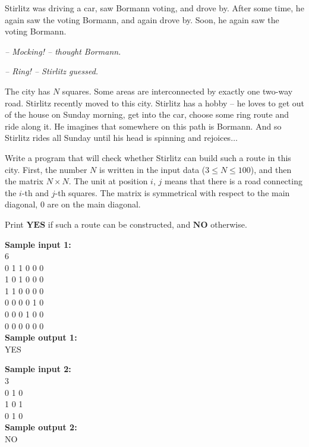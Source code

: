 \documentclass[a4paper]{article}
\begin{document}
Stirlitz was driving a car, saw Bormann voting, and drove by. After some time, he again saw the voting Bormann, and again drove by. Soon, he again saw the voting Bormann.

\textit{-- Mocking! -- thought Bormann.}

\textit{-- Ring! -- Stirlitz guessed.}

The city has $N$ squares. Some areas are interconnected by exactly one two-way road. Stirlitz recently moved to this city. Stirlitz has a hobby -- he loves to get out of the house on Sunday morning, get into the car, choose some ring route and ride along it. He imagines that somewhere on this path is Bormann. And so Stirlitz rides all Sunday until his head is spinning and rejoices$\dots$

Write a program that will check whether Stirlitz can build such a route in this city. First, the number $N$ is written in the input data ($3 \le N \le 100$), and then the matrix $N \times N$. The unit at position $i$, $j$ means that there is a road connecting the $i$-th and $j$-th squares. The matrix is symmetrical with respect to the main diagonal, $0$ are on the main diagonal.

Print $\textbf{YES}$ if such a route can be constructed, and $\textbf{NO}$ otherwise.

\SPACE

\noindent \textbf{Sample input 1:}\\
6\\
0 1 1 0 0 0\\
1 0 1 0 0 0\\
1 1 0 0 0 0\\
0 0 0 0 1 0\\
0 0 0 1 0 0\\
0 0 0 0 0 0\\


\noindent \textbf{Sample output 1:}\\
YES

\SPACE

\noindent \textbf{Sample input 2:}\\
3\\
0 1 0\\
1 0 1\\
0 1 0\\


\noindent \textbf{Sample output 2:}\\
NO
\end{document}
